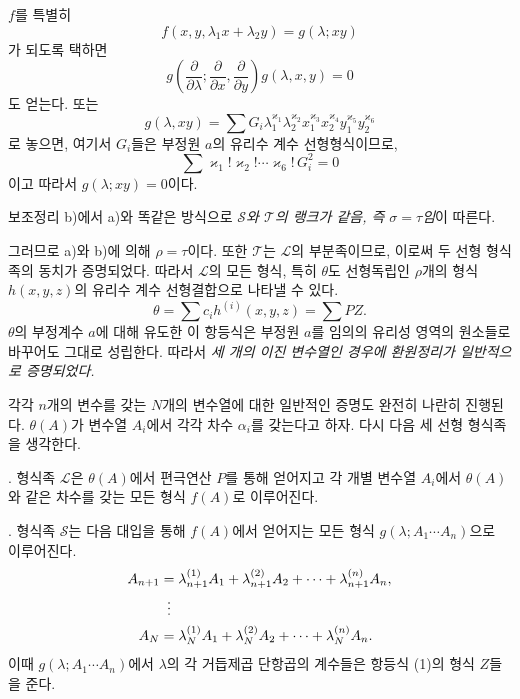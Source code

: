 $f$를 특별히
\[
  f(x,y,\lambda_1x+\lambda_2y)=g(\lambda;xy)
\]
가 되도록 택하면
\[
  g\left(\frac{\partial}{\partial\lambda};
    \frac{\partial}{\partial x},
    \frac{\partial}{\partial y}\right)g(\lambda,x,y)=0
\]
도 얻는다. 또는
\[
  g(\lambda,xy)=\sum G_i\lambda_1^{\varkappa_1}\lambda_2^{\varkappa_2}
  x_1^{\varkappa_3}x_2^{\varkappa_4}y_1^{\varkappa_5}y_2^{\varkappa_6}
\]
로 놓으면, 여기서 $G_i$들은 부정원 $a$의 유리수 계수 선형형식이므로,
\[
  \sum \varkappa_1!\varkappa_2!\cdots\varkappa_6!\,G_i^2=0
\]
이고 따라서 $g(\lambda;xy)=0$이다.

보조정리 b)에서 a)와 똑같은 방식으로 \emph{$\mathcal S$와 $\mathcal T$의 랭크가 같음, 즉 $\sigma=\tau$임}이 따른다.

그러므로 a)와 b)에 의해 $\rho=\tau$이다. 또한 $\mathcal T$는 $\mathcal L$의 부분족이므로, 이로써 두 선형 형식족의 동치가 증명되었다. 따라서 $\mathcal L$의 모든 형식, 특히 $\theta$도 선형독립인 $\rho$개의 형식 $h(x,y,z)$의 유리수 계수 선형결합으로 나타낼 수 있다.
\[
  \theta=\sum c_i h^{(i)}(x,y,z)=\sum PZ.
\]
$\theta$의 부정계수 $a$에 대해 유도한 이 항등식은 부정원 $a$를 임의의 유리성 영역의 원소들로 바꾸어도 그대로 성립한다. 따라서 \emph{세 개의 이진 변수열인 경우에 환원정리가 일반적으로 증명되었다.}

각각 $n$개의 변수를 갖는 $N$개의 변수열에 대한 일반적인 증명도 완전히 나란히 진행된다. $\theta(A)$가 변수열 $A_i$에서 각각 차수 $\alpha_i$를 갖는다고 하자. 다시 다음 세 선형 형식족을 생각한다.

. 형식족 $\mathcal L$은 $\theta(A)$에서 편극연산 $P$를 통해 얻어지고 각 개별 변수열 $A_i$에서 $\theta(A)$와 같은 차수를 갖는 모든 형식 $f(A)$로 이루어진다.

. 형식족 $\mathcal S$는 다음 대입을 통해 $f(A)$에서 얻어지는 모든 형식 $g(\lambda;A_1\cdots A_n)$으로 이루어진다.
\[
\begin{aligned}
 A_{n+1}&=\lambda_{n+1}^{(1)}A_1+\lambda_{n+1}^{(2)}A_2+
        \cdots+\lambda_{n+1}^{(n)}A_n,\\
 &\vdotswithin{=}\\
 A_N&=\lambda_N^{(1)}A_1+\lambda_N^{(2)}A_2+
        \cdots+\lambda_N^{(n)}A_n.
\end{aligned}
\]
이때 $g(\lambda;A_1\cdots A_n)$에서 $\lambda$의 각 거듭제곱 단항곱의 계수들은 항등식 (1)의 형식 $Z$들을 준다.

